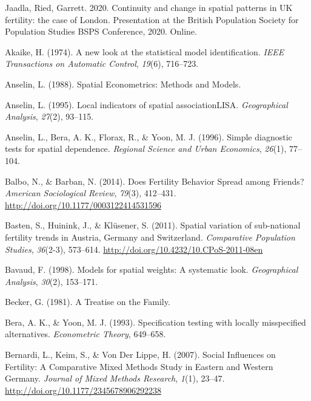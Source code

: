 \documentclass[12pt,twoside]{reedthesis}
\begin{document}
Jaadla, Ried, Garrett. 2020. Continuity and change in spatial patterns in UK fertility: the case of London. Presentation at the British Population Society for Population Studies BSPS Conference, 2020. Online.

\hypertarget{refs}{}
\leavevmode\hypertarget{ref-akaike1974}{}%
Akaike, H. (1974). A new look at the statistical model identification. \emph{IEEE Transactions on Automatic Control}, \emph{19}(6), 716--723.

\leavevmode\hypertarget{ref-anselin1988}{}%
Anselin, L. (1988). Spatial Econometrics: Methods and Models.

\leavevmode\hypertarget{ref-anselin1995}{}%
Anselin, L. (1995). Local indicators of spatial associationLISA. \emph{Geographical Analysis}, \emph{27}(2), 93--115.

\leavevmode\hypertarget{ref-anselin1996}{}%
Anselin, L., Bera, A. K., Florax, R., \& Yoon, M. J. (1996). Simple diagnostic tests for spatial dependence. \emph{Regional Science and Urban Economics}, \emph{26}(1), 77--104.

\leavevmode\hypertarget{ref-balbo2014}{}%
Balbo, N., \& Barban, N. (2014). Does Fertility Behavior Spread among Friends? \emph{American Sociological Review}, \emph{79}(3), 412--431. \url{http://doi.org/10.1177/0003122414531596}

\leavevmode\hypertarget{ref-basten2011}{}%
Basten, S., Huinink, J., \& Klüsener, S. (2011). Spatial variation of sub-national fertility trends in Austria, Germany and Switzerland. \emph{Comparative Population Studies}, \emph{36}(2-3), 573--614. \url{http://doi.org/10.4232/10.CPoS-2011-08en}

\leavevmode\hypertarget{ref-bavaud1998}{}%
Bavaud, F. (1998). Models for spatial weights: A systematic look. \emph{Geographical Analysis}, \emph{30}(2), 153--171.

\leavevmode\hypertarget{ref-becker1981}{}%
Becker, G. (1981). A Treatise on the Family.

\leavevmode\hypertarget{ref-bera1993}{}%
Bera, A. K., \& Yoon, M. J. (1993). Specification testing with locally misspecified alternatives. \emph{Econometric Theory}, 649--658.

\leavevmode\hypertarget{ref-bernardi2007}{}%
Bernardi, L., Keim, S., \& Von Der Lippe, H. (2007). Social Influences on Fertility: A Comparative Mixed Methods Study in Eastern and Western Germany. \emph{Journal of Mixed Methods Research}, \emph{1}(1), 23--47. \url{http://doi.org/10.1177/2345678906292238}
\end{document}
